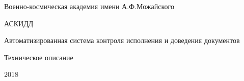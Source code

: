 \thispagestyle{empty}
\begin{center}

Военно-космическая академия имени А.Ф.Можайского


{\Huge АСКИДД}

\vfill

{\Large Автоматизированная система контроля исполнения и доведения документов}

\vfill

Техническое описание


2018
\end{center}